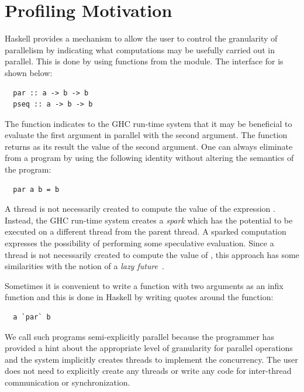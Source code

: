 \section{Profiling Motivation}
Haskell provides a mechanism to allow the user to control the granularity of parallelism by indicating what computations may be usefully carried out in parallel. This is done by using functions from the  module. The interface for  is shown below:
\begin{lstlisting}
  par :: a -> b -> b 
  pseq :: a -> b -> b 
\end{lstlisting}
The function  indicates to the GHC run-time system that it may be beneficial to evaluate the first argument in parallel with the second argument. The  function returns as its result the value of the second argument. One can always eliminate  from a program by using the following identity without altering the semantics of the program:
\begin{lstlisting}
  par a b = b 
\end{lstlisting}
A thread is not necessarily created to compute the value of the expression . Instead, the GHC run-time system creates a {\em spark} which has the potential to be executed on a different thread from the parent thread. A sparked computation expresses the possibility of performing some speculative evaluation. Since a thread is not necessarily created to compute the value of , this approach has some similarities with the notion of a {\em lazy future}~\cite{mohr:91}.

Sometimes it is convenient to write a function with two arguments as an infix function and this is done in Haskell by writing quotes around the function:
\begin{lstlisting}
  a `par` b
\end{lstlisting}

We call such programs semi-explicitly parallel because the programmer has provided a hint about the appropriate level of granularity for parallel operations and the system implicitly creates threads to implement the concurrency. The user does not need to explicitly create any threads or write any code for inter-thread communication or synchronization.

